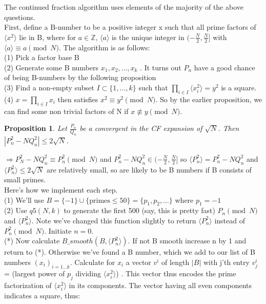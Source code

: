 \documentclass[10pt,a4paper]{report}
\newtheorem*{prop}{Proposition}
\begin{document}
The continued fraction algorithm uses elements of the majority of the above questions. \\

First, define a B-number to be a positive integer x such that all prime factors of $\langle x^2 \rangle$ lie in B, where for $a\in\mathbb{Z}$, $\langle a \rangle$ is the unique integer in $(-\frac{N}{2}, \frac{N}{2}]$ with $\langle a \rangle \equiv a \pmod N$. The algorithm is as follows:\\

(1) Pick a factor base B\\
(2) Generate some B numbers $x_1, x_2, \dots, x_k$ . It turns out $P_n$ have a good chance of being B-numbers by the following proposition\\
(3) Find a non-empty subset $I\subset\{1, \dots ,k\}$ such that $\prod_{i\in I}\langle x_i^2 \rangle=y^2$ is a square.\\
(4) $x=\prod_{i\in I}x_i$ then satisfies $x^2\equiv y^2 \pmod N$. So by the earlier proposition, we can find some non trivial factors of N if $x\not\equiv y \pmod N$. \\

\begin{prop}
Let $\frac{P_n}{Q_n}$ be a convergent in the CF expansion of $\sqrt{N}$. Then $|P_n^2-NQ_n^2|\leq2\sqrt{N}$.
\end{prop}

$\Rightarrow P_N^2-NQ_n^2 \equiv P_n^2 \pmod N$ and $P_n^2-NQ_n^2 \in (-\frac{N}{2}, \frac{N}{2}]$ so $\langle P_n^2\rangle = P_n^2-NQ_n^2$ and $\langle P_n^2\rangle\leq2\sqrt{N}$ are relatively small, so are likely to be B numbers if B consists of small primes.\\

Here's how we implement each step.\\

(1) We'll use $B= \{-1\} \cup \{\text{primes}\leq 50\}  = \{p_1, p_2, \dots\}$ where $p_1=-1$\\

(2) Use $q5(N,k)$ to generate the first 500 (say, this is pretty fast) $P_n \pmod N$ and $\langle P_n^2 \rangle$. Note we've changed this function slightly to return 
 $\langle P_n^2 \rangle$ instead of $P_n^2 \pmod N$. Initiate $n=0$.\\

(*) Now calculate $B\_smooth(B, \langle P_n^2 \rangle)$. If not B smooth increase n by 1 and return to (*). Otherwise we've found a B number, which we add to our list of B numbers $(x_i)_{i=1\dots k}$. Calculate for $x_i$ a vector  $v^{i}$ of length $|B|$ with j'th entry $v^{i}_j$= (largest power of $p_j$ dividing $\langle x_i^2 \rangle$) . This vector thus encodes the prime factorization of $\langle x_i^2 \rangle$ in its components. The vector having all even components indicates a square, thus:\\
 
\end{document}
